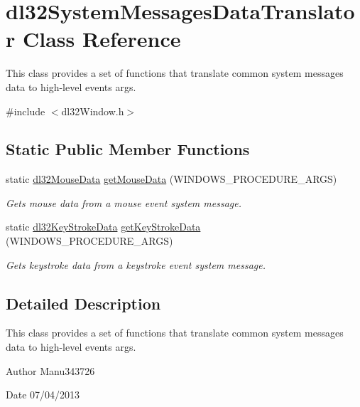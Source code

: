 \hypertarget{classdl32_system_messages_data_translator}{\section{dl32\-System\-Messages\-Data\-Translator Class Reference}
\label{classdl32_system_messages_data_translator}
}


This class provides a set of functions that translate common system messages data to high-\/level events args.  




{\ttfamily \#include $<$dl32\-Window.\-h$>$}

\subsection*{Static Public Member Functions}
\begin{DoxyCompactItemize}
\item 
static \hyperlink{structdl32_mouse_data}{dl32\-Mouse\-Data} \hyperlink{classdl32_system_messages_data_translator_a39baf9617b87a4389d5ad3afd9e672b2}{get\-Mouse\-Data} (W\-I\-N\-D\-O\-W\-S\-\_\-\-P\-R\-O\-C\-E\-D\-U\-R\-E\-\_\-\-A\-R\-G\-S)
\begin{DoxyCompactList}\small\item\em Gets mouse data from a mouse event system message. \end{DoxyCompactList}\item 
static \hyperlink{structdl32_key_stroke_data}{dl32\-Key\-Stroke\-Data} \hyperlink{classdl32_system_messages_data_translator_aceda950eb763bc63d6ccc00acd5a4f06}{get\-Key\-Stroke\-Data} (W\-I\-N\-D\-O\-W\-S\-\_\-\-P\-R\-O\-C\-E\-D\-U\-R\-E\-\_\-\-A\-R\-G\-S)
\begin{DoxyCompactList}\small\item\em Gets keystroke data from a keystroke event system message. \end{DoxyCompactList}\end{DoxyCompactItemize}


\subsection{Detailed Description}
This class provides a set of functions that translate common system messages data to high-\/level events args. 

\begin{DoxyAuthor}{Author}
Manu343726 
\end{DoxyAuthor}
\begin{DoxyDate}{Date}
07/04/2013 
\end{DoxyDate}


